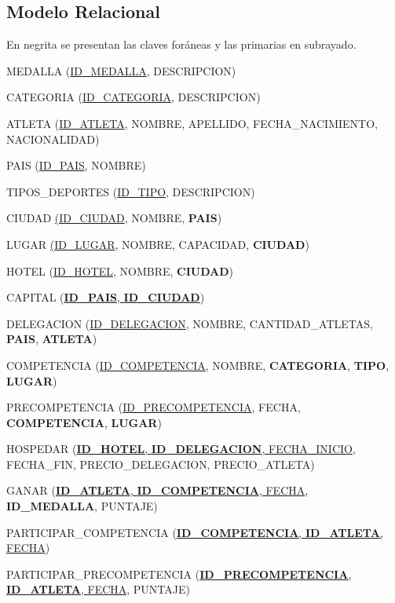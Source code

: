 \documentclass[12pt]{article}
\begin{document}
\subsection{Modelo Relacional}
\label{sec:mr}
\begin{center}
    En negrita se presentan las claves foráneas y las primarias en subrayado.\smallskip
\end{center}\bigskip
{\scriptsize
\noindent
MEDALLA (\underline{ID\_MEDALLA}, DESCRIPCION)\bigskip

\noindent
CATEGORIA (\underline{ID\_CATEGORIA}, DESCRIPCION)\bigskip

\noindent
ATLETA (\underline{ID\_ATLETA}, NOMBRE, APELLIDO, FECHA\_NACIMIENTO, NACIONALIDAD)\bigskip

\noindent
PAIS (\underline{ID\_PAIS}, NOMBRE)\bigskip

\noindent
TIPOS\_DEPORTES (\underline{ID\_TIPO}, DESCRIPCION)\bigskip

\noindent
CIUDAD \underline{(ID\_CIUDAD}, NOMBRE, \textbf{PAIS})\bigskip

\noindent
LUGAR \underline{(ID\_LUGAR}, NOMBRE, CAPACIDAD, \textbf{CIUDAD})\bigskip

\noindent
HOTEL (\underline{ID\_HOTEL}, NOMBRE, \textbf{CIUDAD})\bigskip

\noindent
CAPITAL (\underline{\textbf{ID\_PAIS}, \textbf{ID\_CIUDAD}})\bigskip

\noindent
DELEGACION (\underline{ID\_DELEGACION}, NOMBRE, CANTIDAD\_ATLETAS, \textbf{PAIS}, \textbf{ATLETA})\bigskip

\noindent
COMPETENCIA (\underline{ID\_COMPETENCIA}, NOMBRE, \textbf{CATEGORIA}, \textbf{TIPO}, \textbf{LUGAR})\bigskip

\noindent
PRECOMPETENCIA (\underline{ID\_PRECOMPETENCIA}, FECHA, \textbf{COMPETENCIA}, \textbf{LUGAR})\bigskip

\noindent
HOSPEDAR (\underline{\textbf{ID\_HOTEL}, \textbf{ID\_DELEGACION}, FECHA\_INICIO}, FECHA\_FIN, PRECIO\_DELEGACION, PRECIO\_ATLETA)\bigskip

\noindent
GANAR (\underline{\textbf{ID\_ATLETA}, \textbf{ID\_COMPETENCIA}, FECHA}, \textbf{ID\_MEDALLA}, PUNTAJE)\bigskip

\noindent
PARTICIPAR\_COMPETENCIA (\underline{\textbf{ID\_COMPETENCIA}, \textbf{ID\_ATLETA}, FECHA})\bigskip

\noindent
PARTICIPAR\_PRECOMPETENCIA (\underline{\textbf{ID\_PRECOMPETENCIA}, \textbf{ID\_ATLETA}, FECHA}, PUNTAJE)
}

\newpage
\end{document}
